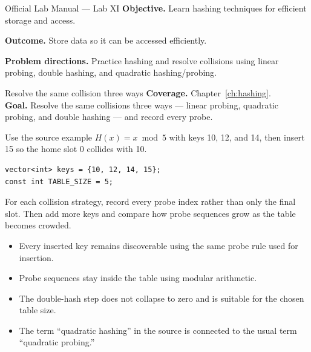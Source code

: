 
\begin{sourcealignment}{Official Lab Manual --- Lab XI}
\textbf{Objective.} Learn hashing techniques for efficient storage and access.

\textbf{Outcome.} Store data so it can be accessed efficiently.

\textbf{Problem directions.} Practice hashing and resolve collisions using linear probing, double hashing, and quadratic hashing/probing.
\end{sourcealignment}

\begin{labproject}{Resolve the same collision three ways}
\textbf{Coverage.} Chapter~\ref{ch:hashing}.\\
\textbf{Goal.} Resolve the same collisions three ways --- linear probing, quadratic probing, and double hashing --- and record every probe.

Use the source example $H(x)=x\bmod5$ with keys 10, 12, and 14, then insert 15 so the home slot 0 collides with 10.

\begin{lstlisting}
vector<int> keys = {10, 12, 14, 15};
const int TABLE_SIZE = 5;
\end{lstlisting}

\begin{tryit}
For each collision strategy, record every probe index rather than only the final slot. Then add more keys and compare how probe sequences grow as the table becomes crowded.
\end{tryit}
\end{labproject}

\begin{verification}
\begin{itemize}
  \item Every inserted key remains discoverable using the same probe rule used for insertion.
  \item Probe sequences stay inside the table using modular arithmetic.
  \item The double-hash step does not collapse to zero and is suitable for the chosen table size.
  \item The term ``quadratic hashing'' in the source is connected to the usual term ``quadratic probing.''
\end{itemize}
\end{verification}

